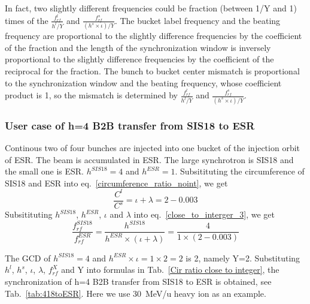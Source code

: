 In fact, two slightly different frequencies could be fraction (between 1/Y and 1) times of the $\frac{f_{rf}^{l}}{h^l/Y}$ and $\frac{f_{rf}^{s}}{(h^s\times \iota)/Y}$. The bucket label frequency and the beating frequency are proportional to the slightly difference frequencies by the coefficient of the fraction and the length of the synchronization window is inversely proportional to the slightly difference frequencies by the coefficient of the reciprocal for the fraction. The bunch to bucket center mismatch is proportional to the synchronization window and the beating frequency, whose coefficient product is 1, so the mismatch is determined by $\frac{f_{rf}^{l}}{h^l/Y}$ and $\frac{f_{rf}^{s}}{(h^s\times \iota)/Y}$.

\subsubsection{User case of h=4 B2B transfer from SIS18 to ESR} 
Continous two of four bunches are injected into one bucket of the injection orbit of ESR. The beam is accumulated in ESR. The large synchrotron is SIS18 and the small one is ESR. $h^{SIS18}=4$ and $h^{ESR}=1$. Subsitituting the circumference of SIS18 and ESR into eq.~\ref{circumference_ratio_noint}, we get
\begin{equation}
\frac{C^l}{C^s}=\iota + \lambda =2-0.003
\end{equation}
Subsitituting $h^{SIS18}$, $h^{ESR}$, $\iota$ and $\lambda$ into eq.~\ref{close_to_interger_3}, we get
\begin{equation}
\frac {f_{rf}^{SIS18}}{f_{rf}^{ESR}}= \frac{h^{SIS18}}{h^{ESR} \times (\iota+ \lambda)}=\frac {4}{1 \times(2-0.003)}
\end{equation}

The GCD of $h^{SIS18}=4$ and $h^{ESR}\times \iota=1\times 2=2$ is 2, namely Y=2. Substituting $h^l$, $h^s$, $\iota$, $\lambda$, $f_{rf}^{X}$ and Y into formulas in Tab.~\ref{Cir ratio close to integer}, the synchronization of h=4 B2B transfer from SIS18 to ESR is obtained, see Tab.~\ref{tab:418toESR}. Here we use \SI{30}{MeV/\atomicmassunit} heavy ion as an example. 


